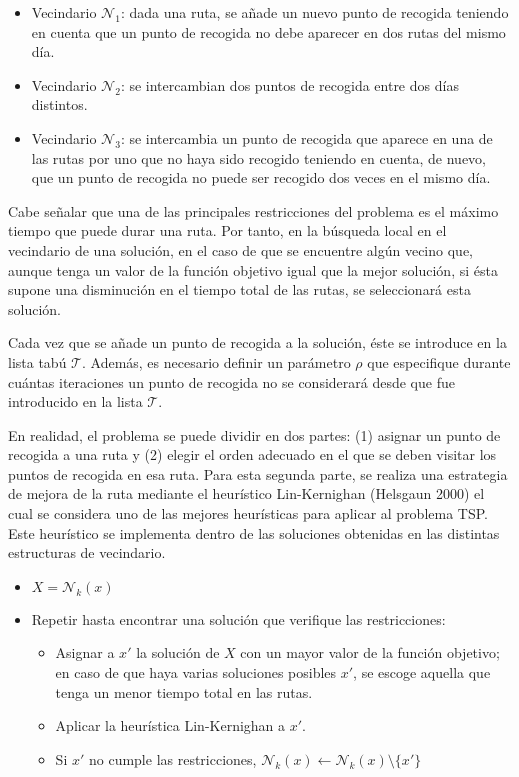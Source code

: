 \documentclass[
]{article}
\providecommand{\tightlist}{%
  \setlength{\itemsep}{0pt}\setlength{\parskip}{0pt}}
\begin{document}
\begin{itemize}
\item
  Vecindario \(\mathcal{N}_1\): dada una ruta, se añade un nuevo punto
  de recogida teniendo en cuenta que un punto de recogida no debe
  aparecer en dos rutas del mismo día.
\item
  Vecindario \(\mathcal{N}_2\): se intercambian dos puntos de recogida
  entre dos días distintos.
\item
  Vecindario \(\mathcal{N}_3\): se intercambia un punto de recogida que
  aparece en una de las rutas por uno que no haya sido recogido teniendo
  en cuenta, de nuevo, que un punto de recogida no puede ser recogido
  dos veces en el mismo día.
\end{itemize}

Cabe señalar que una de las principales restricciones del problema es el
máximo tiempo que puede durar una ruta. Por tanto, en la búsqueda local
en el vecindario de una solución, en el caso de que se encuentre algún
vecino que, aunque tenga un valor de la función objetivo igual que la
mejor solución, si ésta supone una disminución en el tiempo total de las
rutas, se seleccionará esta solución.

Cada vez que se añade un punto de recogida a la solución, éste se
introduce en la lista tabú \(\mathcal{T}\). Además, es necesario definir
un parámetro \(\rho\) que especifique durante cuántas iteraciones un
punto de recogida no se considerará desde que fue introducido en la
lista \(\mathcal{T}\).

En realidad, el problema se puede dividir en dos partes: (1) asignar un
punto de recogida a una ruta y (2) elegir el orden adecuado en el que se
deben visitar los puntos de recogida en esa ruta. Para esta segunda
parte, se realiza una estrategia de mejora de la ruta mediante el
heurístico Lin-Kernighan (Helsgaun 2000) el cual se considera uno de las
mejores heurísticas para aplicar al problema TSP. Este heurístico se
implementa dentro de las soluciones obtenidas en las distintas
estructuras de vecindario.

\begin{itemize}
\tightlist
\item
  \(X = \mathcal{N}_k(x)\)
\item
  Repetir hasta encontrar una solución que verifique las restricciones:

  \begin{itemize}
  \tightlist
  \item
    Asignar a \(x'\) la solución de \(X\) con un mayor valor de la
    función objetivo; en caso de que haya varias soluciones posibles
    \(x'\), se escoge aquella que tenga un menor tiempo total en las
    rutas.
  \item
    Aplicar la heurística Lin-Kernighan a \(x'\).
  \item
    Si \(x'\) no cumple las restricciones,
    \(\mathcal{N}_k(x)\leftarrow \mathcal{N}_k(x) \setminus \{x'\}\)
  \end{itemize}
\end{itemize}
\end{document}
